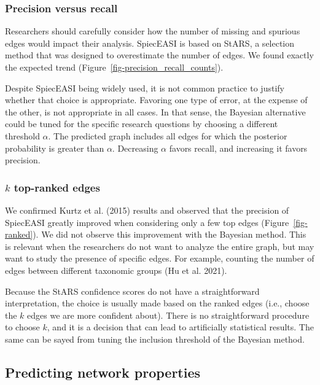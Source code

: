 \documentclass[
  a4paper,
]{article}
\begin{document}
\hypertarget{precision-versus-recall-1}{%
\subsubsection{Precision versus
recall}\label{precision-versus-recall-1}}

Researchers should carefully consider how the number of missing and
spurious edges would impact their analysis. SpiecEASI is based on StARS,
a selection method that was designed to overestimate the number of
edges. We found exactly the expected trend
(Figure~\ref{fig-precision_recall_counts}).

Despite SpiecEASI being widely used, it is not common practice to
justify whether that choice is appropriate. Favoring one type of error,
at the expense of the other, is not appropriate in all cases. In that
sense, the Bayesian alternative could be tuned for the specific research
questions by choosing a different threshold \(\alpha\). The predicted
graph includes all edges for which the posterior probability is greater
than \(\alpha\). Decreasing \(\alpha\) favors recall, and increasing it
favors precision.

\hypertarget{k-top-ranked-edges-1}{%
\subsubsection{\texorpdfstring{\(k\) top-ranked
edges}{k top-ranked edges}}\label{k-top-ranked-edges-1}}

We confirmed Kurtz et al. (2015) results and observed that the precision
of SpiecEASI greatly improved when considering only a few top edges
(Figure~\ref{fig-ranked}). We did not observe this improvement with the
Bayesian method. This is relevant when the researchers do not want to
analyze the entire graph, but may want to study the presence of specific
edges. For example, counting the number of edges between different
taxonomic groups (Hu et al. 2021).

Because the StARS confidence scores do not have a straightforward
interpretation, the choice is usually made based on the ranked edges
(i.e., choose the \(k\) edges we are more confident about). There is no
straightforward procedure to choose \(k\), and it is a decision that can
lead to artificially statistical results. The same can be sayed from
tuning the inclusion threshold of the Bayesian method.

\hypertarget{predicting-network-properties-1}{%
\subsection{Predicting network
properties}\label{predicting-network-properties-1}}
\end{document}
